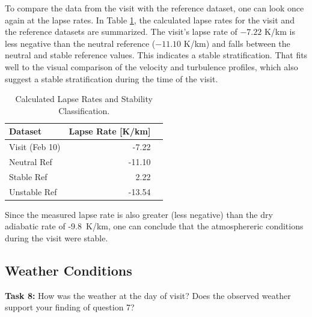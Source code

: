 To compare the data from the visit with the reference dataset, one can look once again at the lapse rates.
In Table \ref{tab:lapse_rates}, the calculated lapse rates for the visit and the reference datasets are summarized. The visit's lapse rate of $-7.22$ K/km is less negative than the neutral reference ($-11.10$ K/km) and falls between the neutral and stable reference values. This indicates a stable stratification.
That fits well to the visual comparison of the velocity and turbulence profiles, which also suggest a stable stratification during the time of the visit.
\begin{table}[H]
    \centering
    \caption{Calculated Lapse Rates and Stability Classification.}
    \label{tab:lapse_rates}
    \begin{tabular}{lrl}
        \hline
        \textbf{Dataset} & \textbf{Lapse Rate [K/km]} \\ \hline
        Visit (Feb 10)   & -7.22                      \\
        Neutral Ref      & -11.10                     \\
        Stable Ref       & 2.22                       \\
        Unstable Ref     & -13.54                     \\ \hline
    \end{tabular}
\end{table}



Since the measured lapse rate is also greater (less negative) than the dry adiabatic rate of -9.8~K/km, one can conclude that the atmosphereric conditions during the visit were stable.

\subsection{Weather Conditions}
\textbf{Task 8:} How was the weather at the day of visit? Does the observed weather support your finding of question 7?


